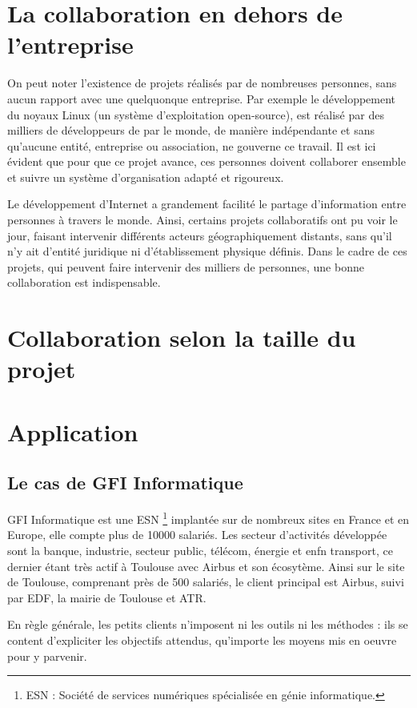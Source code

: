 \section{La collaboration en dehors de l'entreprise}

On peut noter l'existence de projets réalisés par de nombreuses personnes, sans aucun rapport avec une quelquonque entreprise. Par exemple le développement du noyaux Linux (un système d'exploitation open-source), est réalisé par des milliers de développeurs de par le monde, de manière indépendante et sans qu'aucune entité, entreprise ou  association, ne gouverne ce travail. Il est ici évident que pour que ce projet avance, ces personnes doivent collaborer ensemble et suivre un système d'organisation adapté et rigoureux.

Le développement d'Internet a grandement facilité le partage d'information entre personnes à travers le monde. Ainsi, certains projets collaboratifs ont pu voir le jour, faisant intervenir différents acteurs géographiquement distants, sans qu'il n'y ait d'entité juridique ni d'établissement physique définis. Dans le cadre de ces projets, qui peuvent faire intervenir des milliers de personnes, une bonne collaboration est indispensable.

\section{Collaboration selon la taille du projet}

\section{Application}

\subsection{Le cas de GFI Informatique}

GFI Informatique est une \gls{ESN} \footnote{ESN : Société de services numériques spécialisée en génie informatique.} implantée sur de nombreux sites en France et en Europe, elle compte plus de 10000 salariés. Les secteur d'activités développée sont la banque, industrie, secteur public, télécom, énergie et enfn transport, ce dernier étant très actif à Toulouse avec Airbus et son écosytème. Ainsi sur le site de Toulouse, comprenant près de 500 salariés, le client principal est Airbus, suivi par EDF, la mairie de Toulouse et ATR.

En règle générale, les petits clients n'imposent ni les outils ni les méthodes : ils se content d'expliciter les objectifs attendus, qu'importe les moyens mis en oeuvre pour y parvenir.

